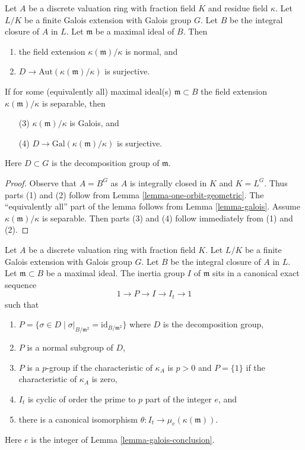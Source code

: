 \begin{lemma}
\label{lemma-galois-galois}
Let $A$ be a discrete valuation ring with fraction field $K$ and residue field
$\kappa$. Let $L/K$ be a finite Galois extension with Galois group $G$.
Let $B$ be the integral closure of $A$ in $L$. Let $\mathfrak m$ be a maximal
ideal of $B$. Then
\begin{enumerate}
\item the field extension $\kappa(\mathfrak m)/\kappa$ is normal, and
\item $D \to \text{Aut}(\kappa(\mathfrak m)/\kappa)$ is surjective.
\end{enumerate}
If for some (equivalently all) maximal ideal(s) $\mathfrak m \subset B$
the field extension $\kappa(\mathfrak m)/\kappa$ is separable, then
\begin{enumerate}
\item[(3)] $\kappa(\mathfrak m)/\kappa$ is Galois, and
\item[(4)] $D \to \text{Gal}(\kappa(\mathfrak m)/\kappa)$ is surjective.
\end{enumerate}
Here $D \subset G$ is the decomposition group of $\mathfrak m$.
\end{lemma}

\begin{proof}
Observe that $A = B^G$ as $A$ is integrally closed in $K$ and $K = L^G$.
Thus parts (1) and (2) follow from Lemma \ref{lemma-one-orbit-geometric}.
The ``equivalently all'' part of the lemma follows from
Lemma \ref{lemma-galois}. Assume $\kappa(\mathfrak m)/\kappa$
is separable. Then parts (3) and (4) follow immediately from (1) and (2).
\end{proof}

\begin{lemma}
\label{lemma-galois-inertia}
Let $A$ be a discrete valuation ring with fraction field $K$.
Let $L/K$ be a finite Galois extension with Galois group $G$.
Let $B$ be the integral closure of $A$ in $L$. Let $\mathfrak m \subset B$
be a maximal ideal. The inertia group $I$ of $\mathfrak m$
sits in a canonical exact sequence
$$
1 \to P \to I \to I_t \to 1
$$
such that
\begin{enumerate}
\item $P = \{\sigma \in D \mid
\sigma|_{B/\mathfrak m^2} = \text{id}_{B/\mathfrak m^2}\}$
where $D$ is the decomposition group,
\item $P$ is a normal subgroup of $D$,
\item $P$ is a $p$-group if the characteristic of $\kappa_A$ is
$p > 0$ and $P = \{1\}$ if the characteristic of $\kappa_A$ is zero,
\item $I_t$ is cyclic of order the prime to $p$ part of the integer $e$, and
\item there is a canonical isomorphism
$\theta : I_t \to \mu_e(\kappa(\mathfrak m))$.
\end{enumerate}
Here $e$ is the integer of Lemma \ref{lemma-galois-conclusion}.
\end{lemma}

